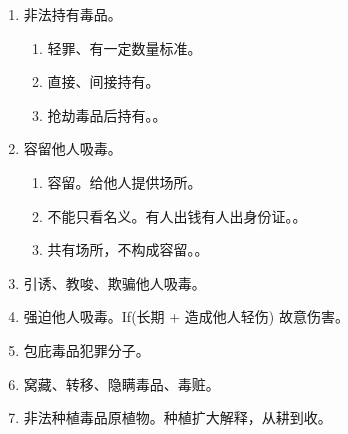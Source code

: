 \begin{enumerate}
\begin{enumerate}
          \item 制造毒品。手段不能犯。既遂。把真正的毒品制造出来。不要求卖出去。
          \item 数量问题。
                \begin{enumerate}
                  \item 无论数量多少，都应追究刑事责任。vs 非法买卖制毒物品（一定数量标准）。
                  \item 走私、贩卖、运输、制造的是同一宗毒品，在数量上不重复计算。
                  \item 不同种类的毒品可以折算为海洛因的数量（有公式）。
                        。
                \end{enumerate}
          \item 特别再犯制度。
        \end{enumerate}
  \item 非法持有毒品。
        \begin{enumerate}
          \item 轻罪、有一定数量标准。
          \item 直接、间接持有。
          \item 抢劫毒品后持有。。
        \end{enumerate}
  \item 容留他人吸毒。
        \begin{enumerate}
          \item 容留。给他人提供场所。
          \item 不能只看名义。有人出钱有人出身份证。。
          \item 共有场所，不构成容留。。
        \end{enumerate}
  \item 引诱、教唆、欺骗他人吸毒。
  \item 强迫他人吸毒。If(长期 + 造成他人轻伤) \yjt 故意伤害。
  \item 包庇毒品犯罪分子。
  \item 窝藏、转移、隐瞒毒品、毒赃。
  \item 非法种植毒品原植物。种植扩大解释，从耕到收。
\end{enumerate}
